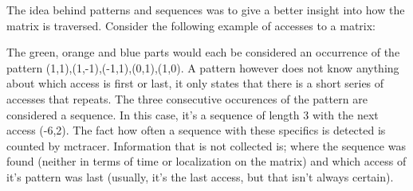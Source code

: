 The idea behind patterns and sequences was to give a better insight into how the matrix is traversed.\newline
Consider the following example of accesses to a matrix:\newline
{}\newline
The green, orange and blue parts would each be considered an occurrence of the pattern (1,1),(1,-1),(-1,1),(0,1),(1,0). A pattern however does not know anything about which access is first or last, it only states that there is a short series of accesses that repeats.\newline
The three consecutive occurences of the pattern are considered a sequence. In this case, it's a sequence of length 3 with the next access (-6,2). The fact how often a sequence with these specifics is detected is counted by mctracer. Information that is not collected is; where the sequence was found (neither in terms of time or localization on the matrix) and which access of it's pattern was last (usually, it's the last access, but that isn't always certain).
